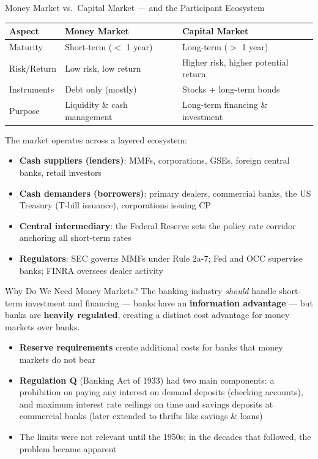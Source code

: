 \documentclass[aspectratio=169]{beamer}
\begin{document}
\begin{frame}{Money Market vs.\ Capital Market --- and the Participant Ecosystem}
\begin{table}
\centering
\small
\begin{tabular}{p{}p{}p{}}
\toprule
\textbf{Aspect} & \textbf{Money Market} & \textbf{Capital Market} \\
\midrule
Maturity & Short-term ($<$ 1 year) & Long-term ($>$ 1 year) \\
Risk/Return & Low risk, low return & Higher risk, higher potential return \\
Instruments & Debt only (mostly) & Stocks + long-term bonds \\
Purpose & Liquidity \& cash management & Long-term financing \& investment \\
\bottomrule
\end{tabular}
\end{table}
\vspace{0.2em}
The market operates across a layered ecosystem:
\begin{itemize}\small
  \item \textbf{Cash suppliers (lenders)}: MMFs, corporations, GSEs, foreign central banks, retail investors
  \item \textbf{Cash demanders (borrowers)}: primary dealers, commercial banks, the US Treasury (T-bill issuance), corporations issuing CP
  \item \textbf{Central intermediary}: the Federal Reserve sets the policy rate corridor anchoring all short-term rates
  \item \textbf{Regulators}: SEC governs MMFs under Rule 2a-7; Fed and OCC supervise banks; FINRA oversees dealer activity
\end{itemize}
\end{frame}

\begin{frame}{Why Do We Need Money Markets?}
The banking industry \emph{should} handle short-term investment and financing --- banks have an \textbf{information advantage} --- but banks are \textbf{heavily regulated}, creating a distinct cost advantage for money markets over banks.
\begin{itemize}
  \item \textbf{Reserve requirements} create additional costs for banks that money markets do not bear
  \item \textbf{Regulation Q} (Banking Act of 1933) had two main components: a prohibition on paying any interest on demand deposits (checking accounts), and maximum interest rate ceilings on time and savings deposits at commercial banks (later extended to thrifts like savings \& loans)
  \item The limits were not relevant until the 1950s; in the decades that followed, the problem became apparent
\end{itemize}
\end{frame}
\end{document}
